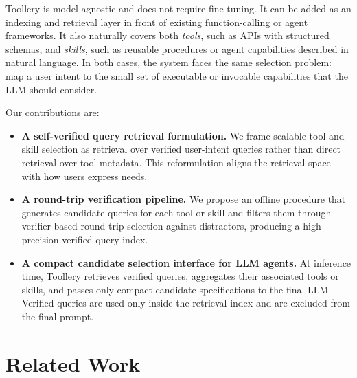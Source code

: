 \documentclass[11pt]{article}
\begin{document}
Toollery is model-agnostic and does not require fine-tuning. It can be added as an indexing and retrieval layer in front of existing function-calling or agent frameworks. It also naturally covers both \emph{tools}, such as APIs with structured schemas, and \emph{skills}, such as reusable procedures or agent capabilities described in natural language. In both cases, the system faces the same selection problem: map a user intent to the small set of executable or invocable capabilities that the LLM should consider.

Our contributions are:
\begin{itemize}
    \item \textbf{A self-verified query retrieval formulation.} We frame scalable tool and skill selection as retrieval over verified user-intent queries rather than direct retrieval over tool metadata. This reformulation aligns the retrieval space with how users express needs.
    \item \textbf{A round-trip verification pipeline.} We propose an offline procedure that generates candidate queries for each tool or skill and filters them through verifier-based round-trip selection against distractors, producing a high-precision verified query index.
    \item \textbf{A compact candidate selection interface for LLM agents.} At inference time, Toollery retrieves verified queries, aggregates their associated tools or skills, and passes only compact candidate specifications to the final LLM. Verified queries are used only inside the retrieval index and are excluded from the final prompt.
\end{itemize}
\section{Related Work}
\label{sec:related_work}
\end{document}
